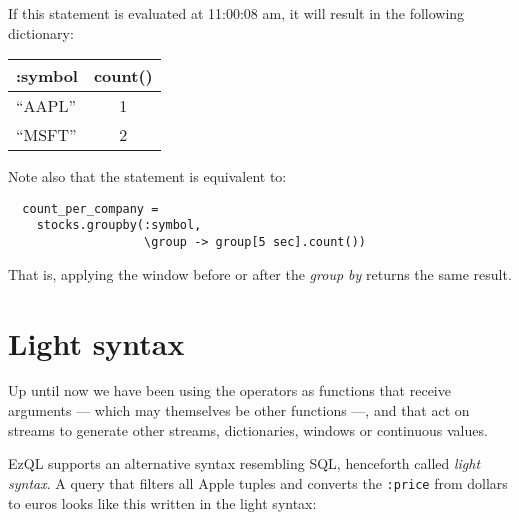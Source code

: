 \documentclass{report}
\begin{document}
If this statement is evaluated at 11:00:08 am, it will result in the
following dictionary:

\begin{tabular}{ |l|c| }
  \hline
  :symbol & count() \\
  \hline
  ``AAPL'' & 1 \\
  ``MSFT'' & 2 \\
  \hline
\end{tabular}

Note also that the statement is equivalent to:

\begin{verbatim}
  count_per_company =
    stocks.groupby(:symbol,
                   \group -> group[5 sec].count())
\end{verbatim}

That is, applying the window before or after the \emph{group by}
returns the same result.

%
%
%
%

\section{Light syntax}
\label{sec:light-syntax}

Up until now we have been using the operators as functions that
receive arguments --- which may themselves be other functions ---, and
that act on streams to generate other streams, dictionaries, windows
or continuous values.

EzQL supports an alternative syntax resembling SQL, henceforth called
\emph{light syntax}. A query that filters all Apple tuples and
converts the \verb=:price= from dollars to euros looks like this
written in the light syntax:
\end{document}
